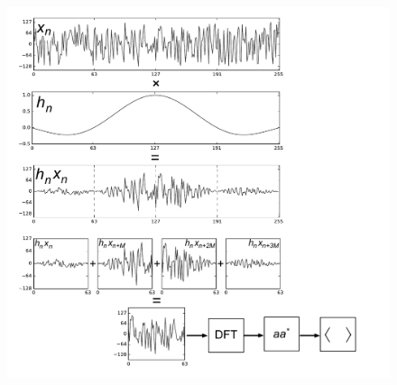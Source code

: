 \documentclass{ws-rv961x669}
\begin{document}
\begin{figure}
 \centering
 \includegraphics[width=\textwidth]{./figures/pfb_chart}
 \caption{\label{fig:pfb_chart}}
\end{figure}




\end{document}

